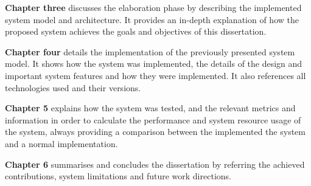 \textbf{Chapter three} discusses the elaboration phase by describing the implemented system model and architecture. It provides an in-depth explanation of how the proposed system achieves the goals and objectives of this dissertation.

\textbf{Chapter four} details the implementation of the previously presented system model. It shows how the system was implemented, the details of the design and important system features and how they were implemented. It also references all technologies used and their versions.

\textbf{Chapter 5} explains how the system was tested, and the relevant metrics and information in order to calculate the performance and system resource usage of the system, always providing a comparison between the implemented the system and a normal implementation.

\textbf{Chapter 6} summarises and concludes the dissertation by referring the achieved contributions, system limitations and future work directions.